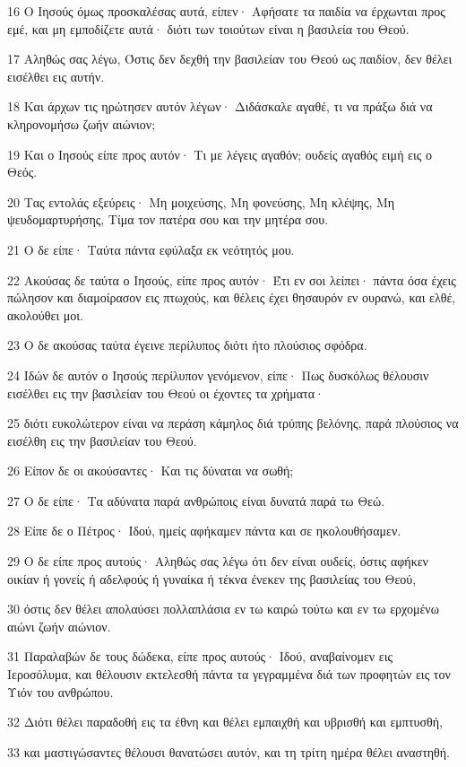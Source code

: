\par 16 Ο Ιησούς όμως προσκαλέσας αυτά, είπεν· Αφήσατε τα παιδία να έρχωνται προς εμέ, και μη εμποδίζετε αυτά· διότι των τοιούτων είναι η βασιλεία του Θεού.
\par 17 Αληθώς σας λέγω, Όστις δεν δεχθή την βασιλείαν του Θεού ως παιδίον, δεν θέλει εισέλθει εις αυτήν.
\par 18 Και άρχων τις ηρώτησεν αυτόν λέγων· Διδάσκαλε αγαθέ, τι να πράξω διά να κληρονομήσω ζωήν αιώνιον;
\par 19 Και ο Ιησούς είπε προς αυτόν· Τι με λέγεις αγαθόν; ουδείς αγαθός ειμή εις ο Θεός.
\par 20 Τας εντολάς εξεύρεις· Μη μοιχεύσης, Μη φονεύσης, Μη κλέψης, Μη ψευδομαρτυρήσης, Τίμα τον πατέρα σου και την μητέρα σου.
\par 21 Ο δε είπε· Ταύτα πάντα εφύλαξα εκ νεότητός μου.
\par 22 Ακούσας δε ταύτα ο Ιησούς, είπε προς αυτόν· Έτι εν σοι λείπει· πάντα όσα έχεις πώλησον και διαμοίρασον εις πτωχούς, και θέλεις έχει θησαυρόν εν ουρανώ, και ελθέ, ακολούθει μοι.
\par 23 Ο δε ακούσας ταύτα έγεινε περίλυπος διότι ήτο πλούσιος σφόδρα.
\par 24 Ιδών δε αυτόν ο Ιησούς περίλυπον γενόμενον, είπε· Πως δυσκόλως θέλουσιν εισέλθει εις την βασιλείαν του Θεού οι έχοντες τα χρήματα·
\par 25 διότι ευκολώτερον είναι να περάση κάμηλος διά τρύπης βελόνης, παρά πλούσιος να εισέλθη εις την βασιλείαν του Θεού.
\par 26 Είπον δε οι ακούσαντες· Και τις δύναται να σωθή;
\par 27 Ο δε είπε· Τα αδύνατα παρά ανθρώποις είναι δυνατά παρά τω Θεώ.
\par 28 Είπε δε ο Πέτρος· Ιδού, ημείς αφήκαμεν πάντα και σε ηκολουθήσαμεν.
\par 29 Ο δε είπε προς αυτούς· Αληθώς σας λέγω ότι δεν είναι ουδείς, όστις αφήκεν οικίαν ή γονείς ή αδελφούς ή γυναίκα ή τέκνα ένεκεν της βασιλείας του Θεού,
\par 30 όστις δεν θέλει απολαύσει πολλαπλάσια εν τω καιρώ τούτω και εν τω ερχομένω αιώνι ζωήν αιώνιον.
\par 31 Παραλαβών δε τους δώδεκα, είπε προς αυτούς· Ιδού, αναβαίνομεν εις Ιεροσόλυμα, και θέλουσιν εκτελεσθή πάντα τα γεγραμμένα διά των προφητών εις τον Υιόν του ανθρώπου.
\par 32 Διότι θέλει παραδοθή εις τα έθνη και θέλει εμπαιχθή και υβρισθή και εμπτυσθή,
\par 33 και μαστιγώσαντες θέλουσι θανατώσει αυτόν, και τη τρίτη ημέρα θέλει αναστηθή.
